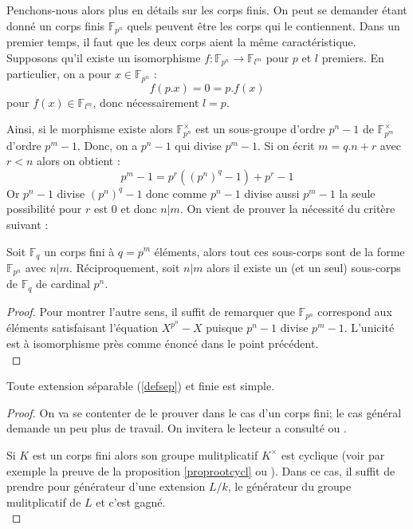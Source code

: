 \documentclass[a4paper]{article} %
\numberwithin{section}{part}
\numberwithin{equation}{section}
\newcommand\GF[1]{\mathbb{F}_{#1}}
\begin{document}
Penchons-nous alors plus en détails sur les corps finis. On peut se demander
étant donné un corps finis $\GF{p^n}$ quels peuvent être les corps qui le
contiennent. Dans un premier temps, il faut que les deux corps aient la même
caractéristique. Supposons qu'il existe un isomorphisme $f : \GF{p^n} \to 
\GF{l^m}$ pour $p$ et $l$ premiers. En particulier, on a pour $x\in\GF{p^n}$ :
\[f(p.x) = 0 = p.f(x)\]
pour $f(x)\in\GF{l^m}$, donc nécessairement $l = p$.\par
Ainsi, si le morphisme existe alors $\GF{p^n}^{\times}$ est un sous-groupe
d'ordre $p^n - 1$ de $\GF{p^m}^{\times}$ d'ordre $p^m - 1$. Donc, on a $p^n - 1$
qui divise $p^m - 1$. Si on écrit $m = q.n + r$ avec $r < n$ alors on obtient :
\[p^m - 1 = p^r((p^n)^q - 1) + p^r - 1\]
Or $p^n - 1$ divise $(p^n)^q - 1$ donc comme $p^n - 1$ divise aussi $p^m - 1$ la
seule possibilité pour $r$ est $0$ et donc $n|m$. On vient de prouver la
nécessité du critère suivant :

\begin{prop}
Soit $\GF{q}$ un corps fini à $q = p^m$ éléments, alors tout ces sous-corps sont
de la forme $\GF{p^n}$ avec $n|m$. Réciproquement, soit $n|m$ alors il existe un
(et un seul) sous-corps de $\GF{q}$ de cardinal $p^n$.
\end{prop}
\begin{proof}
Pour montrer l'autre sens, il suffit de remarquer que $\GF{p^n}$ correspond aux
éléments satisfaisant l'équation $X^{p^n} - X$ puisque $p^n - 1$ divise $p^m -
1$. L'unicité est à isomorphisme près comme énoncé dans le point précédent.\\
\end{proof}

\begin{thm}
\label{thelemprim}
Toute extension séparable (\ref{defsep}) et finie est simple.
\end{thm}
\begin{proof}
On va se contenter de le prouver dans le cas d'un corps fini; le cas général
demande un peu plus de travail. On invitera le lecteur a consulté
\cite[p.~87]{Esc} ou \cite[Chap. VIII]{Pol}.\par
Si $K$ est un corps fini alors son groupe mulitplicatif $K^{\times}$ est
cyclique (voir par exemple la preuve de la proposition \ref{proprootcycl} ou
\cite[p.~50]{LiNi1}). Dans ce cas, il suffit de prendre pour générateur d'une
extension $L/k$, le générateur du groupe mulitplicatif de $L$ et c'est gagné.\\
\end{proof}
\end{document}
